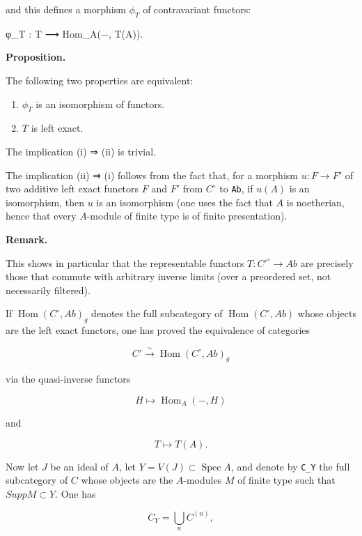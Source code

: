\documentclass[
]{article}
\newenvironment{Shaded}{}{}
\newcommand{\NormalTok}[1]{#1}
\providecommand{\tightlist}{%
  \setlength{\itemsep}{0pt}\setlength{\parskip}{0pt}}
\begin{document}
and this defines a morphism \(\phi_{T}\) of contravariant functors:

\begin{Shaded}
\begin{Highlighting}[]
\NormalTok{φ\_T : T ⟶ Hom\_A(−, T(A)).}
\end{Highlighting}
\end{Shaded}

\textbf{Proposition.}

The following two properties are equivalent:

\begin{enumerate}
\def\labelenumi{\arabic{enumi}.}
\tightlist
\item
  \(\phi_{T}\) is an isomorphism of functors.
\item
  \(T\) is left exact.
\end{enumerate}

The implication (i) ⇒ (ii) is trivial.

The implication (ii) ⇒ (i) follows from the fact that, for a morphism
\(u : F \to F'\) of two additive left exact functors \(F\) and \(F'\)
from \(C^{\circ}\) to \texttt{Ab}, if \(u(A)\) is an isomorphism, then
\(u\) is an isomorphism (one uses the fact that \(A\) is noetherian,
hence that every \(A\)-module of finite type is of finite presentation).

\textbf{Remark.}

This shows in particular that the representable functors
\(T : C'^{\circ} \to Ab\) are precisely those that commute with
arbitrary inverse limits (over a preordered set, not necessarily
filtered).

If \(\operatorname{Hom}(C^{\circ}, Ab)_{g}\) denotes the full
subcategory of \(\operatorname{Hom}(C^{\circ}, Ab)\) whose objects are
the left exact functors, one has proved the equivalence of categories

\[
C' \xrightarrow{\sim} \operatorname{Hom}(C^{\circ}, Ab)_{g}
\]

via the quasi-inverse functors

\[
H \mapsto \operatorname{Hom}_{A}(-, H)
\]

and

\[
T \mapsto T(A).
\]

Now let \(J\) be an ideal of \(A\), let
\(Y = V(J) \subset \operatorname{Spec} A\), and denote by \texttt{C\_Y}
the full subcategory of \(C\) whose objects are the \(A\)-modules \(M\)
of finite type such that \(Supp M \subset Y\). One has

\[
C_{Y} = \bigcup_{n} C^{(n)},
\]
\end{document}
